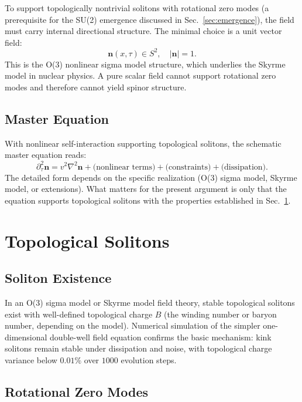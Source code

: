 \documentclass[11pt,a4paper]{article}
\begin{document}
To support topologically nontrivial solitons with rotational zero modes (a prerequisite for the SU(2) emergence discussed in Sec.~\ref{sec:emergence}), the field must carry internal directional structure. The minimal choice is a unit vector field:
\begin{equation}
\mathbf{n}(x, \tau) \in S^2, \quad |\mathbf{n}| = 1.
\end{equation}
This is the O(3) nonlinear sigma model structure, which underlies the Skyrme model in nuclear physics. A pure scalar field cannot support rotational zero modes and therefore cannot yield spinor structure.

\subsection{Master Equation}

With nonlinear self-interaction supporting topological solitons, the schematic master equation reads:
\begin{equation}
\partial_\tau^2 \mathbf{n} = v^2 \nabla^2 \mathbf{n} + \text{(nonlinear terms)} + \text{(constraints)} + \text{(dissipation)}.
\end{equation}
The detailed form depends on the specific realization (O(3) sigma model, Skyrme model, or extensions). What matters for the present argument is only that the equation supports topological solitons with the properties established in Sec.~\ref{sec:solitons}.

\section{Topological Solitons}
\label{sec:solitons}

\subsection{Soliton Existence}

In an O(3) sigma model or Skyrme model field theory, stable topological solitons exist with well-defined topological charge $B$ (the winding number or baryon number, depending on the model). Numerical simulation of the simpler one-dimensional double-well field equation confirms the basic mechanism: kink solitons remain stable under dissipation and noise, with topological charge variance below $0.01\%$ over $1000$ evolution steps.

\subsection{Rotational Zero Modes}
\end{document}
